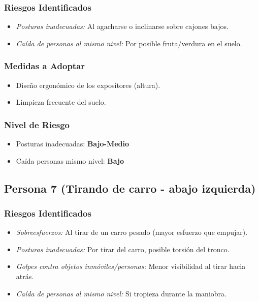 \documentclass[12pt,a4paper]{article}
\begin{document}
	\subsubsection{Riesgos Identificados}
	\begin{itemize}
		\item \textit{Posturas inadecuadas:} Al agacharse o inclinarse sobre cajones bajos.
		\item \textit{Caída de personas al mismo nivel:} Por posible fruta/verdura en el suelo.
	\end{itemize}
	
	\subsubsection{Medidas a Adoptar}
	\begin{itemize}
		\item Diseño ergonómico de los expositores (altura).
		\item Limpieza frecuente del suelo.
	\end{itemize}
	
	\subsubsection{Nivel de Riesgo}
	\begin{itemize}
		\item Posturas inadecuadas: \textbf{Bajo-Medio}
		\item Caída personas mismo nivel: \textbf{Bajo}
	\end{itemize}
	
	\bigskip\hrulefill\bigskip
	
	\subsection{Persona 7 (Tirando de carro - abajo izquierda)}
	
	\subsubsection{Riesgos Identificados}
	\begin{itemize}
		\item \textit{Sobreesfuerzos:} Al tirar de un carro pesado (mayor esfuerzo que empujar).
		\item \textit{Posturas inadecuadas:} Por tirar del carro, posible torsión del tronco.
		\item \textit{Golpes contra objetos inmóviles/personas:} Menor visibilidad al tirar hacia atrás.
		\item \textit{Caída de personas al mismo nivel:} Si tropieza durante la maniobra.
	\end{itemize}
	
\end{document}
